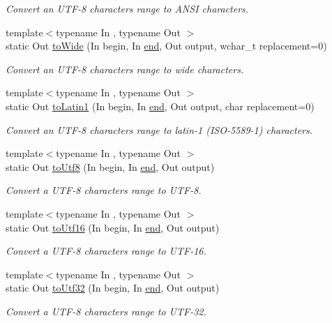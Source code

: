 \begin{DoxyCompactItemize}
\begin{DoxyCompactList}\small\item\em Convert an U\-T\-F-\/8 characters range to A\-N\-S\-I characters. \end{DoxyCompactList}\item 
{\footnotesize template$<$typename In , typename Out $>$ }\\static Out \hyperlink{classsf_1_1_utf_3_018_01_4_ac6633c64ff1fad6bd1bfe72c37b3a468}{to\-Wide} (In begin, In \hyperlink{gl3_8h_a432111147038972f06e049e18a837002}{end}, Out output, wchar\-\_\-t replacement=0)
\begin{DoxyCompactList}\small\item\em Convert an U\-T\-F-\/8 characters range to wide characters. \end{DoxyCompactList}\item 
{\footnotesize template$<$typename In , typename Out $>$ }\\static Out \hyperlink{classsf_1_1_utf_3_018_01_4_adf6f6e0a8ee0527c8ab390ce5c0b6b13}{to\-Latin1} (In begin, In \hyperlink{gl3_8h_a432111147038972f06e049e18a837002}{end}, Out output, char replacement=0)
\begin{DoxyCompactList}\small\item\em Convert an U\-T\-F-\/8 characters range to latin-\/1 (I\-S\-O-\/5589-\/1) characters. \end{DoxyCompactList}\item 
{\footnotesize template$<$typename In , typename Out $>$ }\\static Out \hyperlink{classsf_1_1_utf_3_018_01_4_aef68054cab6a592c0b04de94e93bb520}{to\-Utf8} (In begin, In \hyperlink{gl3_8h_a432111147038972f06e049e18a837002}{end}, Out output)
\begin{DoxyCompactList}\small\item\em Convert a U\-T\-F-\/8 characters range to U\-T\-F-\/8. \end{DoxyCompactList}\item 
{\footnotesize template$<$typename In , typename Out $>$ }\\static Out \hyperlink{classsf_1_1_utf_3_018_01_4_a925ac9e141dcb6f9b07c7b95f7cfbda2}{to\-Utf16} (In begin, In \hyperlink{gl3_8h_a432111147038972f06e049e18a837002}{end}, Out output)
\begin{DoxyCompactList}\small\item\em Convert a U\-T\-F-\/8 characters range to U\-T\-F-\/16. \end{DoxyCompactList}\item 
{\footnotesize template$<$typename In , typename Out $>$ }\\static Out \hyperlink{classsf_1_1_utf_3_018_01_4_a79395429baba13dd04a8c1fba745ce65}{to\-Utf32} (In begin, In \hyperlink{gl3_8h_a432111147038972f06e049e18a837002}{end}, Out output)
\begin{DoxyCompactList}\small\item\em Convert a U\-T\-F-\/8 characters range to U\-T\-F-\/32. \end{DoxyCompactList}\end{DoxyCompactItemize}


